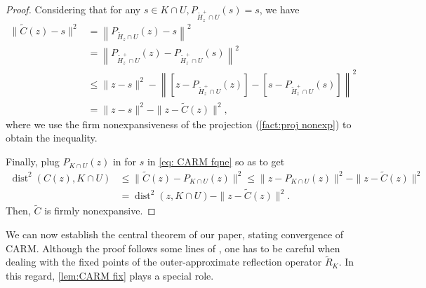 \documentclass[smallextended,numbook,nospthms]{svjour3}
\theoremstyle{plain}
\theoremstyle{definition}
\DeclareMathOperator{\dist}{dist}
\begin{document}
\begin{proof}
	Considering that for any $s \in K \cap U, P_{\tilde{H}_{z}^{+} \cap U}(s)=s$, we have
	\begin{align}
	\|\tilde{C}(z)-s\|^{2}& =\left\|P_{\tilde{H}_{z} \cap U}(z)-s\right\|^{2} \\
		&=\left\|P_{\tilde{H}_{z}^{+} \cap U}(z)-P_{\tilde{H}_{z}^{+} \cap U}(s)\right\|^{2} \\
		&\leq\|z-s\|^{2}-\left\|\left[z-P_{\tilde{H}_{z}^{+} \cap U}(z)\right]-\left[s-P_{\tilde{H}_{z}^{+} \cap U}(s)\right]\right\|^{2} \\
		&=\|z-s\|^{2}-\|z-\tilde{C}(z)\|^{2},
	\end{align}
	where we use the firm nonexpansiveness of the projection (\cref{fact:proj nonexp}) to obtain the inequality.
	
	Finally, plug $P_{K \cap U}(z)$ in for $s$ in \cref{eq: CARM fqne} so as to get
	\begin{align}
		\dist^{2}(C(z), K \cap U) & \leq\|\tilde{C}(z)-P_{K \cap U}(z)\|^{2} \leq\|z-P_{K \cap U}(z)\|^{2}-\|z-\tilde{C}(z)\|^{2} \\
		&=\dist^{2}(z, K \cap U)-\|z-\tilde{C}(z)\|^{2}.
	\end{align}
	Then, $\tilde{C}$ is firmly nonexpansive.
\end{proof}

We can now establish the central theorem of our paper, stating convergence of CARM. Although the proof follows some lines of \cite[Theorem 1]{Behling:2020}, one has to be careful when dealing with the fixed points of the outer-approximate reflection operator $\tilde{R}_{K}$. In this regard, \cref{lem:CARM fix} plays a special role.
\end{document}
